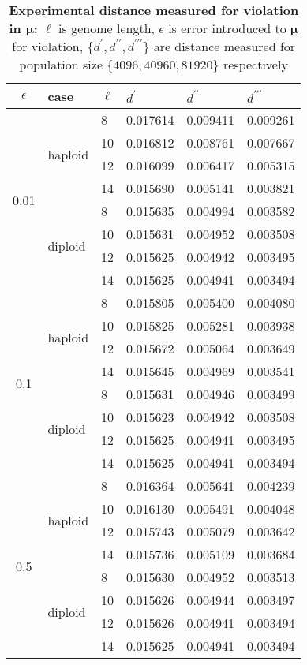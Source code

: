 \begin{table}[ht]
\caption{\textbf{Experimental distance measured for violation in $\bm{\mu}$:} $\ell$ is genome length, $\epsilon$ is error introduced to $\bm{\mu}$ for violation, $\{d^\prime, d^{\prime\prime}, d^{\prime\prime\prime}\}$ are distance measured for population size $\{4096, 40960, 81920\}$ respectively}
\centering
\begin{tabularx}{0.75\textwidth}{ c *{5}{X}}
\toprule
$\epsilon$ & case & $\ell$ & $d^\prime$ & $d^{\prime\prime}$ & $d^{\prime\prime\prime}$ \\
\midrule
\multirow{8}{*}{0.01} & \multirow{4}{*}{haploid} 	& 8 & 0.017614	& 0.009411	& 0.009261 \\
		      &   				& 10 & 0.016812	& 0.008761 	& 0.007667 \\ 
		      & 			 	& 12 & 0.016099	& 0.006417 	& 0.005315 \\
		      &  	 			& 14 & 0.015690	& 0.005141 	& 0.003821 \\ 
		      \cmidrule(l){2-6}
		      & \multirow{4}{*}{diploid} 	& 8 & 0.015635	&  0.004994	& 0.003582 \\
		      &  	 			& 10 & 0.015631	&  0.004952	& 0.003508 \\
		      & 			 	& 12 & 0.015625	&  0.004942	& 0.003495 \\
		      &  	 			& 14 & 0.015625	&  0.004941	& 0.003494 \\
		      \midrule
\multirow{8}{*}{0.1} & \multirow{4}{*}{haploid} 	& 8 & 0.015805	& 0.005400 	& 0.004080 \\
		      &   				& 10 & 0.015825	& 0.005281 	& 0.003938 \\	
		      & 				& 12 & 0.015672	& 0.005064 	& 0.003649 \\	
		      &  	 			& 14 & 0.015645	& 0.004969 	& 0.003541 \\
		      \cmidrule(l){2-6}
		      & \multirow{4}{*}{diploid} 	& 8 & 0.015631	&  0.004946	& 0.003499 \\
		      &  	 			& 10 & 0.015623	&  0.004942	& 0.003508 \\
		      & 				& 12 & 0.015625	&  0.004941	& 0.003495 \\
		      &  	 			& 14 & 0.015625	&  0.004941	& 0.003494 \\
		      \midrule
\multirow{8}{*}{0.5} & \multirow{4}{*}{haploid} 	& 8 & 0.016364	&  0.005641	& 0.004239 \\
		      &   				& 10 & 0.016130	&  0.005491	& 0.004048 \\
		      & 				& 12 & 0.015743	&  0.005079	& 0.003642 \\
		      &  	 			& 14 & 0.015736	&  0.005109	& 0.003684 \\
		      \cmidrule(l){2-6}
		      & \multirow{4}{*}{diploid} 	& 8 & 0.015630	&  0.004952	& 0.003513 \\	
		      &  	 			& 10 & 0.015626	&  0.004944 	& 0.003497 \\
		      &  				& 12 & 0.015626	&  0.004941	& 0.003494 \\
		      &  	 			& 14 & 0.015625	&  0.004941	& 0.003494 \\
\bottomrule
\end{tabularx}
\label{distanceMu}
\end{table}